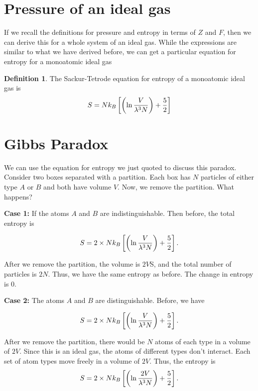 \documentclass[12pt,chapterprefix=false,dvipsnames]{scrbook}
\theoremstyle{dotless}
\theoremstyle{definition}
\newtheorem{protodefinition}{Definition}[section]
\newenvironment{definition}
{\colorlet{shadecolor}{black!15}\begin{shaded}\begin{protodefinition}}
			{\end{protodefinition}\end{shaded}}
\begin{document}
\section{Pressure of an ideal gas}%
\label{sec:pressure_of_an_ideal_gas}

If we recall the definitions for pressure and entropy in terms
of $Z$ and $F$, then we
can derive this for a whole system of an ideal gas. While the
expressions are similar to what we have derived before, we can
get a particular equation for entropy for a monoatomic ideal gas

\begin{definition}
	The Sackur-Tetrode equation for entropy of a monoatomic ideal
	gas is
	\begin{equation}
		S = N k_B \left[ \left(\naturallogarithm{\frac{V}{\lambda^3 N}}\right) + \frac{5}{2} \right]
	\end{equation}
\end{definition}

\section{Gibbs Paradox}%
\label{sec:gibbs_paradox}

We can use the equation for entropy we just quoted to discuss
this paradox. Consider two boxes separated with a partition.
Each box has $N$ particles of either type
$A$ or $B$ and both have
volume $V$. Now, we remove the partition.
What happens?

\textbf{Case 1:} If the atoms $A$
and $B$ are indistinguishable. Then before,
the total entropy is

\begin{equation}
	S = 2 \times N k_B \left[
		\left(\naturallogarithm{\frac{V}{\lambda^3 N}}\right) + \frac{5}{2}\right].
\end{equation}

After we remove the partition, the volume is
$2 V$S, and the total number of particles is
$2 N$. Thus, we have the same entropy as
before. The change in entropy is 0.

\textbf{Case 2:} The atoms $A$ and
$B$ are distinguishable. Before, we have

\begin{equation}
	S = 2 \times N k_B \left[
		\left(\naturallogarithm{\frac{V}{\lambda^3 N}}\right) + \frac{5}{2}\right].
\end{equation}

After we remove the partition, there would be
$N$ atoms of each type in a volume of
$2V$. Since this is an ideal gas, the atoms
of different types don't interact. Each set of atom types move
freely in a volume of $2V$. Thus, the entropy
is
\begin{equation}
	S = 2 \times N k_B \left[
		\left(\naturallogarithm{\frac{2V}{\lambda^3 N}}\right) + \frac{5}{2}\right].
\end{equation}
\end{document}
